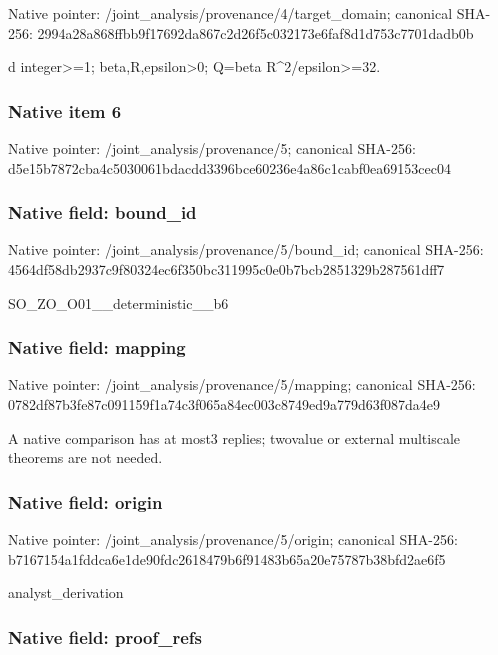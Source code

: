 \documentclass[10pt,a4paper]{article}
\begin{document}
Native pointer: /joint\_analysis/provenan\allowbreak{}ce/4/target\_domain; canonical SHA-256: 2994a28a868ffbb9f17692da\allowbreak{}867c2d26f5c032173e6faf8d\allowbreak{}1d753c7701dadb0b


d integer>=1; beta,R,epsilon>0; Q=beta R\textasciicircum{}2/epsilon>=32.


\subsubsection{Native item 6}


Native pointer: /joint\_analysis/provenance/5; canonical SHA-256: d5e15b7872cba4c5030061bd\allowbreak{}acdd3396bce60236e4a86c1c\allowbreak{}abf0ea69153cec04



\subsubsection{Native field: bound\_id}


Native pointer: /joint\_analysis/provenance/5/bound\_id; canonical SHA-256: 4564df58db2937c9f80324ec\allowbreak{}6f350bc311995c0e0b7bcb28\allowbreak{}51329b287561dff7


SO\_ZO\_O01\_\_deterministic\_\_b6


\subsubsection{Native field: mapping}


Native pointer: /joint\_analysis/provenance/5/mapping; canonical SHA-256: 0782df87b3fe87c091159f1a\allowbreak{}74c3f065a84ec003c8749ed9\allowbreak{}a779d63f087da4e9


A native comparison has at most3 replies; twovalue or external multiscale theorems are not needed.


\subsubsection{Native field: origin}


Native pointer: /joint\_analysis/provenance/5/origin; canonical SHA-256: b7167154a1fddca6e1de90fd\allowbreak{}c2618479b6f91483b65a20e7\allowbreak{}5787b38bfd2ae6f5


analyst\_derivation


\subsubsection{Native field: proof\_refs}
\end{document}
